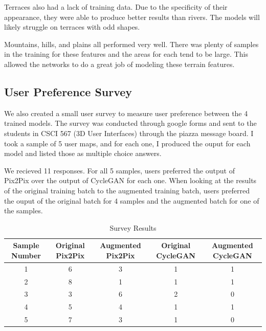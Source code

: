 \documentclass[twocolumn]{article}
\begin{document}
	Terraces also had a lack of training data. Due to the specificity of their appearance, they were able to produce better results than rivers. The models will likely struggle on terraces with odd shapes.

	Mountains, hills, and plains all performed very well. There was plenty of samples in the training for these features and the areas for each tend to be large. This allowed the networks to do a great job of modeling these terrain features.

	\subsection{User Preference Survey}
	
	We also created a small user survey to measure user preference between the 4 trained models. The survey was conducted through google forms and sent to the students in CSCI 567 (3D User Interfaces) through the piazza message board. I took a sample of 5 user maps, and for each one, I produced the ouput for each model and listed those as multiple choice answers.
	
	We recieved 11 responses. For all 5 samples, users preferred the output of Pix2Pix over the output of CycleGAN for each one. When looking at the results of the original training batch to the augmented training batch, users preferred the ouput of the original batch for 4 samples and the augmented batch for one of the samples.

	\begin{table}[h]
		\begin{tabular}{c|c|c|c|c}
			Sample Number & Original Pix2Pix & Augmented Pix2Pix & Original CycleGAN & Augmented CycleGAN \\
			\hline
			1 & 6 & 3 & 1 & 1 \\
			2 & 8 & 1 & 1 & 1 \\
			3 & 3 & 6 & 2 & 0 \\
			4 & 5 & 4 & 1 & 1 \\
			5 & 7 & 3 & 1 & 0
		\end{tabular}
		
	\caption{Survey Results}
	\end{table}	
	
\end{document}
